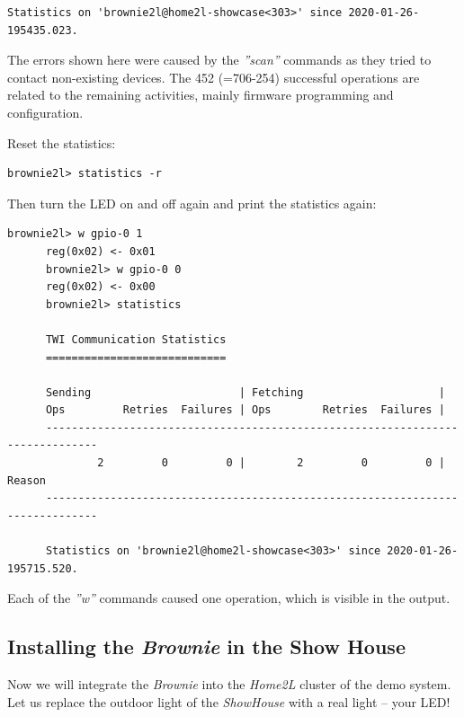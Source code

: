 \documentclass[12pt,english,parskip=half,headheight=19pt]{scrreprt}
\begin{document}
\begin{itemize}[$\blacktriangleright$]
\begin{lstlisting}[language=brownie2l]
      Statistics on 'brownie2l@home2l-showcase<303>' since 2020-01-26-195435.023.

    \end{lstlisting}
    The errors shown here were caused by the \textit{''scan''} commands as they tried to contact non-existing
    devices. The 452 (=706-254) successful operations are related to the remaining activities, mainly
    firmware programming and configuration.
    
    Reset the statistics:
    \begin{lstlisting}[language=brownie2l]
      brownie2l> statistics -r
    \end{lstlisting}
    Then turn the LED on and off again and print the statistics again:
    \begin{lstlisting}[language=brownie2l]
      brownie2l> w gpio-0 1
      reg(0x02) <- 0x01
      brownie2l> w gpio-0 0
      reg(0x02) <- 0x00
      brownie2l> statistics

      TWI Communication Statistics
      ============================

      Sending                       | Fetching                     |
      Ops         Retries  Failures | Ops        Retries  Failures |
      ------------------------------------------------------------------------------
              2         0         0 |        2         0         0 | Reason
      ------------------------------------------------------------------------------

      Statistics on 'brownie2l@home2l-showcase<303>' since 2020-01-26-195715.520.
    \end{lstlisting}
    Each of the \textit{''w''} commands caused one operation, which is visible in the output.
\end{itemize}



\subsection{Installing the \textit{Brownie} in the Show House}
\label{sec:tutorial-brownies-resources}

Now we will integrate the \textit{Brownie} into the \textit{Home2L} cluster of the demo system.
Let us replace the outdoor light of the \textit{ShowHouse} with a real light -- your LED!
\end{document}
